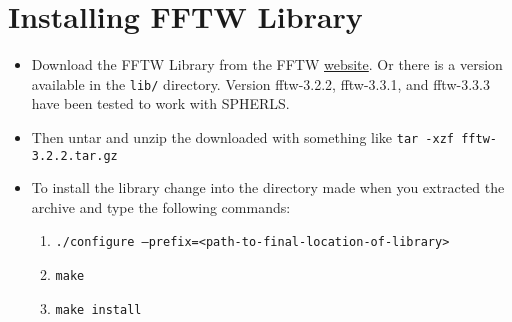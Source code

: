 \documentclass[12pt,a4paper]{book}
\begin{document}
\section{Installing FFTW Library}
\begin{itemize}
\item Download the FFTW Library from the FFTW \href{http://www.fftw.org/download.html}{website}. Or there is a version available in the {\tt lib/} directory. Version fftw-3.2.2, fftw-3.3.1, and fftw-3.3.3 have been tested to work with SPHERLS.
\item Then untar and unzip the downloaded with something like {\tt tar -xzf fftw-3.2.2.tar.gz}
\item To install the library change into the directory made when you extracted the archive and type the following commands:
\begin{enumerate}
\item {\tt ./configure --prefix\-=<path-to-final-location-of-library>}
\item {\tt make}
\item {\tt make install}
\end{enumerate}
\end{itemize}
\end{document}
